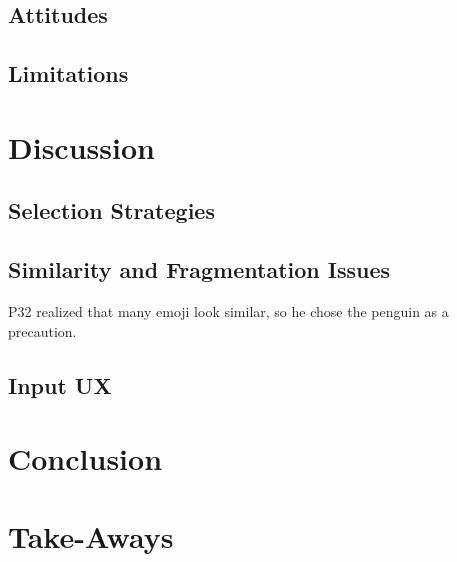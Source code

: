 \subsection{Attitudes}




\subsection{Limitations}

\section{Discussion}

\subsection{Selection Strategies}


\subsection{Similarity and Fragmentation Issues}

P32 realized that many emoji look similar, so he chose the penguin as a precaution.


\subsection{Input UX}


\section{Conclusion}


\section{Take-Aways}
